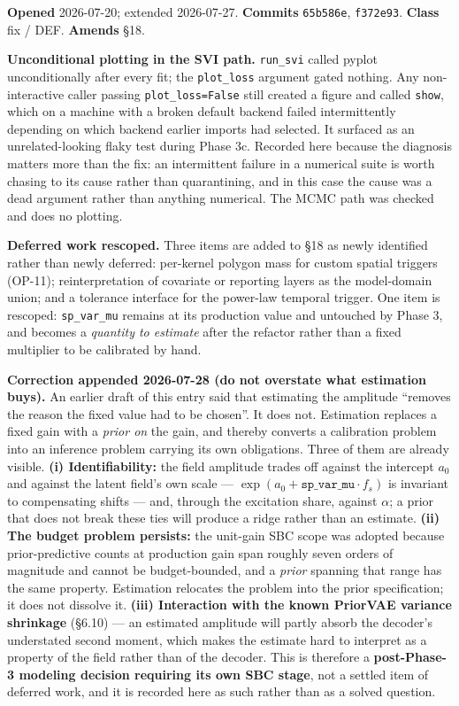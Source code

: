 \documentclass[
  10pt,
]{article}
\begin{document}
\textbf{Opened} 2026-07-20; extended 2026-07-27. \textbf{Commits} \texttt{65b586e}, \texttt{f372e93}. \textbf{Class} fix / DEF. \textbf{Amends} §18.

\textbf{Unconditional plotting in the SVI path.} \texttt{run\_svi} called pyplot unconditionally after every fit; the \texttt{plot\_loss} argument gated nothing. Any non-interactive caller passing \texttt{plot\_loss=False} still created a figure and called \texttt{show}, which on a machine with a broken default backend failed intermittently depending on which backend earlier imports had selected. It surfaced as an unrelated-looking flaky test during Phase 3c. Recorded here because the diagnosis matters more than the fix: an intermittent failure in a numerical suite is worth chasing to its cause rather than quarantining, and in this case the cause was a dead argument rather than anything numerical. The MCMC path was checked and does no plotting.

\textbf{Deferred work rescoped.} Three items are added to §18 as newly identified rather than newly deferred: per-kernel polygon mass for custom spatial triggers (OP-11); reinterpretation of covariate or reporting layers as the model-domain union; and a tolerance interface for the power-law temporal trigger. One item is rescoped: \texttt{sp\_var\_mu} remains at its production value and untouched by Phase 3, and becomes a \emph{quantity to estimate} after the refactor rather than a fixed multiplier to be calibrated by hand.

\textbf{Correction appended 2026-07-28 (do not overstate what estimation buys).} An earlier draft of this entry said that estimating the amplitude ``removes the reason the fixed value had to be chosen''. It does not. Estimation replaces a fixed gain with a \emph{prior on} the gain, and thereby converts a calibration problem into an inference problem carrying its own obligations. Three of them are already visible. \textbf{(i) Identifiability:} the field amplitude trades off against the intercept \(a_0\) and against the latent field's own scale --- \(\exp(a_0 + \texttt{sp\_var\_mu}\cdot f_s)\) is invariant to compensating shifts --- and, through the excitation share, against \(\alpha\); a prior that does not break these ties will produce a ridge rather than an estimate. \textbf{(ii) The budget problem persists:} the unit-gain SBC scope was adopted because prior-predictive counts at production gain span roughly seven orders of magnitude and cannot be budget-bounded, and a \emph{prior} spanning that range has the same property. Estimation relocates the problem into the prior specification; it does not dissolve it. \textbf{(iii) Interaction with the known PriorVAE variance shrinkage} (§6.10) --- an estimated amplitude will partly absorb the decoder's understated second moment, which makes the estimate hard to interpret as a property of the field rather than of the decoder. This is therefore a \textbf{post-Phase-3 modeling decision requiring its own SBC stage}, not a settled item of deferred work, and it is recorded here as such rather than as a solved question.
\end{document}
